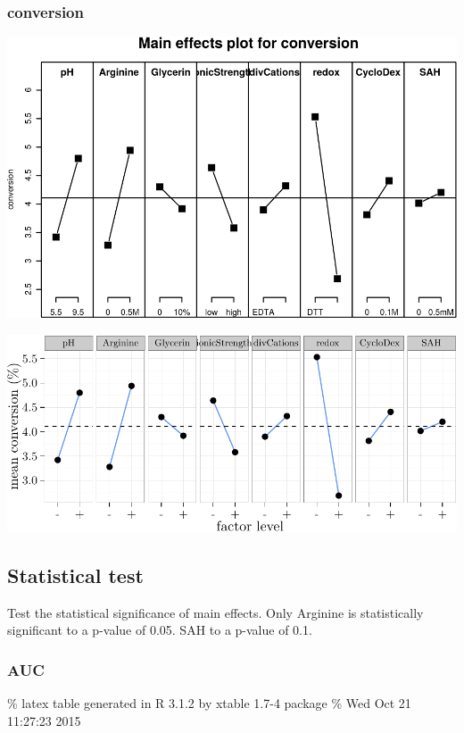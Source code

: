 \documentclass[]{article}
\begin{document}
\subsubsection{conversion}\label{conversion}

\includegraphics{analysis_files/figure-latex/unnamed-chunk-11-1.pdf}

\includegraphics{analysis_files/figure-latex/unnamed-chunk-12-1.pdf}

\subsection{Statistical test}\label{statistical-test-1}

Test the statistical significance of main effects. Only Arginine is
statistically significant to a p-value of 0.05. SAH to a p-value of 0.1.

\subsubsection{AUC}\label{auc-1}

\% latex table generated in R 3.1.2 by xtable 1.7-4 package \% Wed Oct
21 11:27:23 2015
\end{document}
